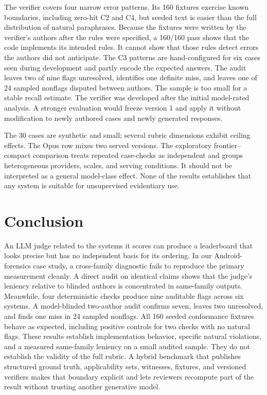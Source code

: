 \documentclass[conference]{IEEEtran}
\newcommand{\checkc}[1]{\textsc{#1}}
\begin{document}
The verifier covers four narrow error patterns. Its 160 fixtures exercise known
boundaries, including zero-hit C2 and C4, but seeded text is easier than the full
distribution of natural paraphrases. Because the fixtures were written by the
verifier's authors after the rules were specified, a 160/160 pass shows that
the code implements its intended rules. It cannot show that those rules detect
errors the authors did not anticipate. The \checkc{C3} patterns are
hand-configured for six cases seen during development and partly encode the
expected answers. The audit leaves two of nine flags
unresolved, identifies one definite miss, and leaves one of 24 sampled nonflags
disputed between authors. The
sample is too small for a stable recall estimate. The verifier was developed after the
initial model-rated analysis. A stronger evaluation would freeze version 1 and
apply it without modification to newly authored cases and newly generated
responses.

The 30 cases are synthetic and small; several rubric dimensions exhibit ceiling
effects. The Opus row mixes two served versions. The exploratory
frontier--compact comparison treats repeated case-checks as independent and
groups heterogeneous providers, scales, and serving conditions. It should not
be interpreted as a general model-class effect. None of the results establishes
that any system is suitable for unsupervised evidentiary use.

\section{Conclusion}
An LLM judge related to the systems it scores can produce a leaderboard that
looks precise but has no independent basis for its ordering. In our Android-forensics case study, a
cross-family diagnostic fails to reproduce the primary measurement cleanly. A
direct audit on identical claims shows that the judge's leniency relative to
blinded authors is concentrated in same-family outputs. Meanwhile, four
deterministic checks produce nine auditable flags across six systems.
A model-blinded two-author audit confirms seven, leaves two unresolved, and
finds one miss in 24 sampled nonflags. All 160 seeded conformance fixtures behave as expected, including
positive controls for two checks with no natural flags. These results establish
implementation behavior, specific natural violations, and a measured
same-family leniency on a small audited sample. They do not establish the
validity of the full rubric. A hybrid benchmark that publishes structured
ground truth, applicability sets, witnesses, fixtures, and versioned verifiers
makes that boundary explicit and lets reviewers recompute part of the result
without trusting another generative model.
\end{document}
